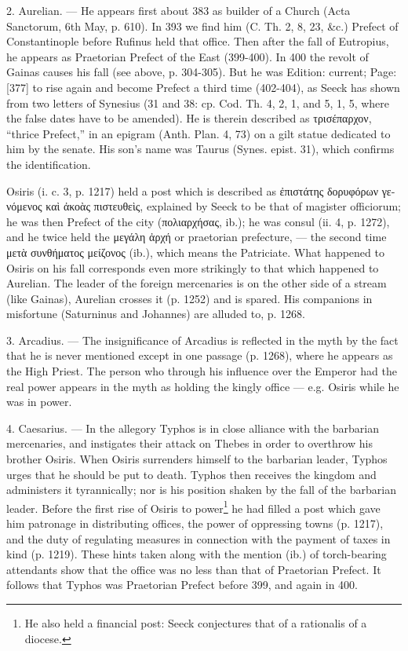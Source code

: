 2. Aurelian. \texthebrew{—} He appears first about 383 as builder of a Church (Acta Sanctorum, 6th May, p. 610). In 393 we find him (C. Th. 2, 8, 23, \&c.) Prefect of Constantinople before Rufinus held that office. Then after the fall of Eutropius, he appears as Praetorian Prefect of the East (399-400). In 400 the revolt of Gainas causes his fall (see above, p. 304-305). But he was Edition: current; Page: [377] to rise again and become Prefect a third time (402-404), as Seeck has shown from two letters of Synesius (31 and 38: cp. Cod. Th. 4, 2, 1, and 5, 1, 5, where the false dates have to be amended). He is therein described as \textgreek{τρισέπαρχον}, \texthebrew{“}thrice Prefect,\texthebrew{}” in an epigram (Anth. Plan. 4, 73) on a gilt statue dedicated to him by the senate. His son\texthebrew{}’s name was Taurus (Synes. epist. 31), which confirms the identification.

Osiris (i. c. 3, p. 1217) held a post which is described as \textgreek{\texthebrew{ἐ}πιστάτης δορυφόρων γενόμενος κα\texthebrew{ὶ ἀ}κο\texthebrew{ὰ}ς πιστευθε\texthebrew{ὶ}ς}, explained by Seeck to be that of magister officiorum; he was then Prefect of the city (\textgreek{πολιαρχήσας}, ib.); he was consul (ii. 4, p. 1272), and he twice held the \textgreek{μεγάλη \texthebrew{ἀ}ρχή} or praetorian prefecture, \texthebrew{—} the second time \textgreek{μετ\texthebrew{ὰ} συνθήματος μείζονος} (ib.), which means the Patriciate. What happened to Osiris on his fall corresponds even more strikingly to that which happened to Aurelian. The leader of the foreign mercenaries is on the other side of a stream (like Gainas), Aurelian crosses it (p. 1252) and is spared. His companions in misfortune (Saturninus and Johannes) are alluded to, p. 1268.

3. Arcadius. \texthebrew{—} The insignificance of Arcadius is reflected in the myth by the fact that he is never mentioned except in one passage (p. 1268), where he appears as the High Priest. The person who through his influence over the Emperor had the real power appears in the myth as holding the kingly office \texthebrew{—} e.g. Osiris while he was in power.

4. Caesarius. \texthebrew{—} In the allegory Typhos is in close alliance with the barbarian mercenaries, and instigates their attack on Thebes in order to overthrow his brother Osiris. When Osiris surrenders himself to the barbarian leader, Typhos urges that he should be put to death. Typhos then receives the kingdom and administers it tyrannically; nor is his position shaken by the fall of the barbarian leader. Before the first rise of Osiris to power\footnote{He also held a financial post: Seeck conjectures that of a rationalis of a diocese.} he had filled a post which gave him patronage in distributing offices, the power of oppressing towns (p. 1217), and the duty of regulating measures in connection with the payment of taxes in kind (p. 1219). These hints taken along with the mention (ib.) of torch-bearing attendants show that the office was no less than that of Praetorian Prefect. It follows that Typhos was Praetorian Prefect before 399, and again in 400.

